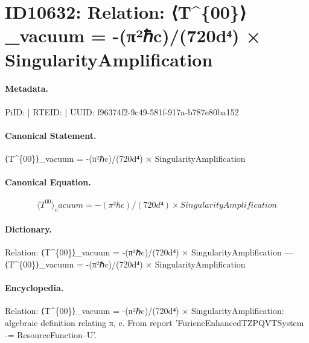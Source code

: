 \section*{ID10632: Relation: ⟨T\textasciicircum{}\{00\}⟩\_vacuum = -(π²ℏc)/(720d⁴) × SingularityAmplification}
\paragraph{Metadata.}
PiID:  | RTEID:  | UUID: f96374f2-9c49-581f-917a-b787e80ba152

\paragraph{Canonical Statement.}
⟨T\textasciicircum{}\{00\}⟩\_vacuum = -(π²ℏc)/(720d⁴) × SingularityAmplification

\paragraph{Canonical Equation.}
\[
⟨T^{00}⟩_vacuum = -(π²ℏc)/(720d⁴) × SingularityAmplification
\]

\paragraph{Dictionary.}
Relation: ⟨T\textasciicircum{}\{00\}⟩\_vacuum = -(π²ℏc)/(720d⁴) × SingularityAmplification — ⟨T\textasciicircum{}\{00\}⟩\_vacuum = -(π²ℏc)/(720d⁴) × SingularityAmplification

\paragraph{Encyclopedia.}
Relation: ⟨T\textasciicircum{}\{00\}⟩\_vacuum = -(π²ℏc)/(720d⁴) × SingularityAmplification: algebraic definition relating π, c. From report 'FurieneEnhancedTZPQVTSystem -= ResourceFunction--U'.
